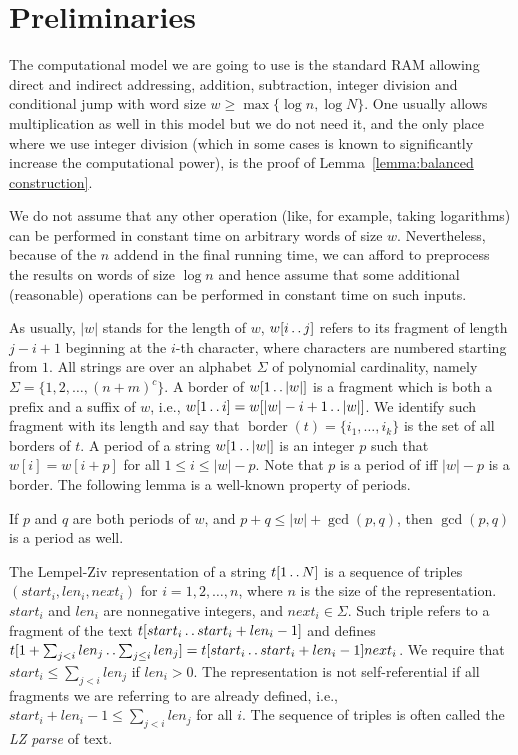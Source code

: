 \documentclass[runningheads]{llncs}
\DeclareMathOperator{\bord}{border}
\newcommand{\twodots}{\mathinner{\ldotp\ldotp}}
\begin{document}
\section{Preliminaries}

The computational model we are going to use is the standard RAM allowing direct and indirect addressing, addition, subtraction, integer division and conditional jump with word size $w\geq\max\{\log n,\log N\}$. One usually allows multiplication as well in this model but we do not need it, and the only place where we use integer division (which in some cases is known to significantly increase the computational power), is the proof of Lemma~\ref{lemma:balanced construction}.

We do not assume that any other operation (like, for example, taking logarithms) can be performed in constant time on arbitrary words of size $w$. Nevertheless, because of the $n$ addend in the final running time, we can afford to preprocess the results on words of size $\log n$ and hence assume that some additional (reasonable) operations can be performed in constant time on such inputs.

As usually, $|w|$ stands for the length of $w$, $w[i\twodots j]$ refers to its fragment of length $j-i+1$ beginning at the $i$-th character, where characters are numbered starting from $1$. All strings are over an alphabet $\Sigma$ of polynomial cardinality, namely $\Sigma=\{1,2,\ldots,(n+m)^c\}$.  A border of $w[1\twodots |w|]$ is a fragment which is both a prefix and a suffix of $w$, i.e., $w[1\twodots i]=w[|w|-i+1\twodots |w|]$. We identify such fragment with its length and say that $\bord(t)=\{i_1,\ldots,i_k \}$ is the set of all borders of $t$. A period of a string $w[1\twodots |w|]$ is an integer $p$ such that $w[i]=w[i+p]$ for all $1\leq i\leq |w|-p$. Note that $p$ is a period of iff $|w|-p$ is a border. The following lemma is a well-known property of periods.

\begin{lemma}\label{lemma:periodicity}
If $p$ and $q$ are both periods of $w$, and $p+q\leq |w|+\gcd(p,q)$, then $\gcd(p,q)$ is a period as well.
\end{lemma}

The Lempel-Ziv representation of a string $t[1\twodots N]$ is a sequence of triples $(start_i,len_i,next_i)$ for $i=1,2,\ldots,n$, where $n$ is the size of the representation. $start_i$ and $len_i$ are nonnegative integers, and $next_i\in\Sigma$. Such triple refers to a fragment of the text $t[start_i\twodots start_i+len_i-1]$ and defines $t[1+\sum_{j<i}len_j\twodots\sum_{j\leq i}len_j]=t[start_i\twodots start_i+len_i-1]next_i$. We require that $start_i\leq\sum_{j<i}len_j$ if $len_i>0$. The representation is not self-referential if all fragments we are referring to are already defined, i.e., $start_i+len_i-1\leq\sum_{j<i}len_j$ for all $i$. The sequence of triples is often called the {\it LZ parse} of text.
\end{document}
